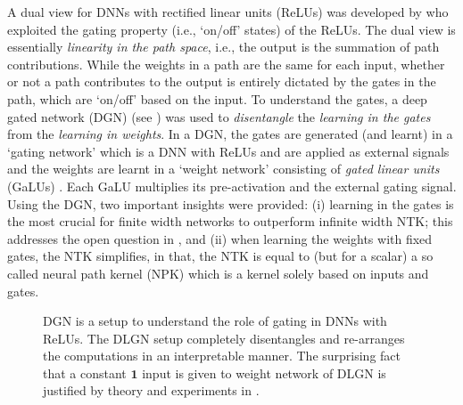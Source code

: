 A dual view for DNNs with rectified linear units (ReLUs) was developed by \cite{npk} who exploited the gating property (i.e., `on/off' states) of the ReLUs. The dual view is essentially \emph{linearity in the path space}, i.e., the output is the summation of path contributions.  While the weights in a path are the same for each input, whether or not a path contributes to the output is entirely dictated by the gates in the path, which are `on/off' based on the input. To understand the gates, a deep gated network (DGN) (see ) was used to \emph{disentangle} the \emph{learning in the gates} from the \emph{learning in weights}. In a DGN,  the gates are generated (and learnt) in a `gating network' which is a DNN with ReLUs and are applied as external signals and the weights are learnt in a `weight network' consisting of \emph{gated linear units} (GaLUs) \citep{sss}. Each GaLU multiplies its pre-activation and the external gating signal. Using the DGN, two important insights were provided:  (i) learning in the gates is the most crucial for finite width networks to outperform infinite width NTK; this addresses the open question in \cite{arora2019exact}, and (ii) when learning the weights with fixed gates, the NTK simplifies, in that, the NTK is equal to (but for a scalar) a so called neural path kernel (NPK) which is a kernel solely based on inputs and gates.
\begin{figure}[!t]
\centering
\begin{minipage}{1.0\columnwidth}
\centering
\begin{minipage}{0.49\columnwidth}
\centering

\resizebox{0.8\columnwidth}{!}{

}
\end{minipage}
\begin{minipage}{0.49\columnwidth}
\centering

\resizebox{0.8\columnwidth}{!}{

}
\end{minipage}

\end{minipage}
\caption{\small{DGN is a setup to understand the role of gating in DNNs with ReLUs. The DLGN setup completely disentangles and re-arranges the computations in an interpretable manner. The surprising fact that a constant $\mathbf{1}$ input is given to weight network of DLGN is justified by theory and experiments in .}}
\label{fig:lgln}
\end{figure}

